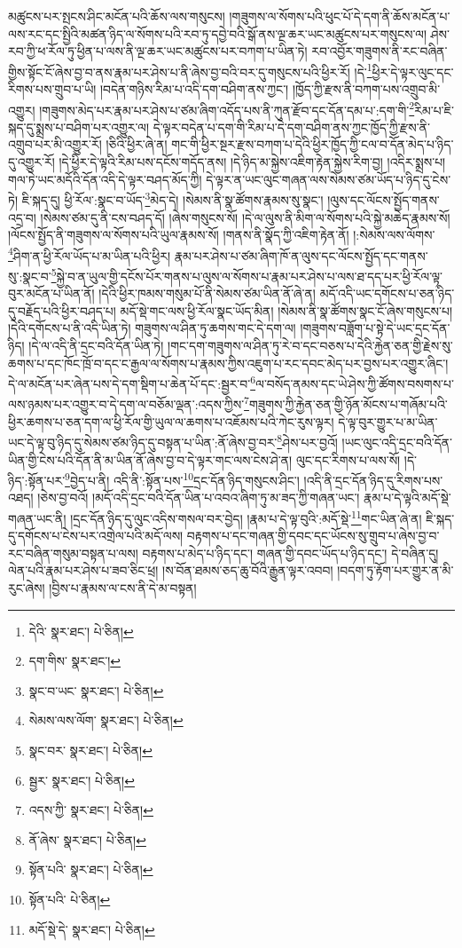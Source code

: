 མཚུངས་པར་སྤངས་ཤིང་མངོན་པའི་ཆོས་ལས་གསུངས། །གཟུགས་ལ་སོགས་པའི་ཕུང་པོ་དེ་དག་ནི་ཆོས་མངོན་པ་ལས་རང་དང་སྤྱིའི་མཚན་ཉིད་ལ་སོགས་པའི་རབ་ཏུ་དབྱེ་བའི་སྒོ་ནས་ལྔ་ཆར་ཡང་མཚུངས་པར་གསུངས་ལ། ཤེས་རབ་ཀྱི་ཕ་རོལ་ཏུ་ཕྱིན་པ་ལས་ནི་ལྔ་ཆར་ཡང་མཚུངས་པར་བཀག་པ་ཡིན་ཏེ། རབ་འབྱོར་གཟུགས་ནི་རང་བཞིན་གྱིས་སྟོང་ངོ་ཞེས་བྱ་བ་ནས་རྣམ་པར་ཤེས་པ་ནི་ཞེས་བྱ་བའི་བར་དུ་གསུངས་པའི་ཕྱིར་རོ། །དེ་\footnote{དེའི་  སྣར་ཐང་།  པེ་ཅིན། }ཕྱིར་དེ་ལྟར་ལུང་དང་རིགས་པས་གྲུབ་པ་ཡི། །བདེན་གཉིས་རིམ་པ་འདི་དག་བཤིག་ནས་ཀྱང་། །ཁྱོད་ཀྱི་རྫས་ནི་བཀག་པས་འགྲུབ་མི་འགྱུར། །གཟུགས་མེད་པར་རྣམ་པར་ཤེས་པ་ཙམ་ཞིག་འདོད་པས་ནི་ཀུན་རྫོབ་དང་དོན་དམ་པ་:དག་གི་\footnote{དག་གིས་  སྣར་ཐང་། }རིམ་པ་ཇི་སྐད་དུ་སྨྲས་པ་བཤིག་པར་འགྱུར་ལ། དེ་ལྟར་བདེན་པ་དག་གི་རིམ་པ་དེ་དག་བཤིག་ནས་ཀྱང་ཁྱོད་ཀྱི་རྫས་ནི་འགྲུབ་པར་མི་འགྱུར་རོ། །ཅིའི་ཕྱིར་ཞེ་ན། གང་གི་ཕྱིར་སྔར་རྫས་བཀག་པ་དེའི་ཕྱིར་ཁྱོད་ཀྱི་ངལ་བ་དོན་མེད་པ་ཉིད་དུ་འགྱུར་རོ། །དེ་ཕྱིར་དེ་ལྟའི་རིམ་པས་དངོས་གདོད་ནས། །དེ་ཉིད་མ་སྐྱེས་འཇིག་རྟེན་སྐྱེས་རིག་བྱ། །འདིར་སྨྲས་པ། གལ་ཏེ་ཡང་མདོའི་དོན་འདི་དེ་ལྟར་བཤད་མོད་ཀྱི། དེ་ལྟར་ན་ཡང་ལུང་གཞན་ལས་སེམས་ཙམ་ཡོད་པ་ཉིད་དུ་ངེས་ཏེ། ཇི་སྐད་དུ། ཕྱི་རོལ་:སྣང་བ་ཡོད་\footnote{སྣང་བ་ཡང་  སྣར་ཐང་།  པེ་ཅིན། }མེད་དེ། །སེམས་ནི་སྣ་ཚོགས་རྣམས་སུ་སྣང་། །ལུས་དང་ལོངས་སྤྱོད་གནས་འདྲ་བ། །སེམས་ཙམ་དུ་ནི་ངས་བཤད་དོ། །ཞེས་གསུངས་སོ། །དེ་ལ་ལུས་ནི་མིག་ལ་སོགས་པའི་སྐྱེ་མཆེད་རྣམས་སོ། །ལོངས་སྤྱོད་ནི་གཟུགས་ལ་སོགས་པའི་ཡུལ་རྣམས་སོ། །གནས་ནི་སྣོད་ཀྱི་འཇིག་རྟེན་ནོ། །:སེམས་ལས་ལོགས་\footnote{སེམས་ལས་ལོག་  སྣར་ཐང་།  པེ་ཅིན། }ཤིག་ན་ཕྱི་རོལ་ཡོད་པ་མ་ཡིན་པའི་ཕྱིར། རྣམ་པར་ཤེས་པ་ཙམ་ཞིག་ཁོ་ན་ལུས་དང་ལོངས་སྤྱོད་དང་གནས་སུ་:སྣང་བ་\footnote{སྣང་བར་  སྣར་ཐང་།  པེ་ཅིན། }སྐྱེ་བ་ན་ཡུལ་གྱི་དངོས་པོར་གནས་པ་ལུས་ལ་སོགས་པ་རྣམ་པར་ཤེས་པ་ལས་ཐ་དད་པར་ཕྱི་རོལ་ལྟ་བུར་མངོན་པ་ཡིན་ནོ། །དེའི་ཕྱིར་ཁམས་གསུམ་པོ་ནི་སེམས་ཙམ་ཡིན་ནོ་ཞེ་ན། མདོ་འདི་ཡང་དགོངས་པ་ཅན་ཉིད་དུ་བརྗོད་པའི་ཕྱིར་བཤད་པ། མདོ་སྡེ་གང་ལས་ཕྱི་རོལ་སྣང་ཡོད་མིན། །སེམས་ནི་སྣ་ཚོགས་སྣང་ངོ་ཞེས་གསུངས་པ། །དེའི་དགོངས་པ་ནི་འདི་ཡིན་ཏེ། གཟུགས་ལ་ཤིན་ཏུ་ཆགས་གང་དེ་དག་ལ། །གཟུགས་བཟློག་པ་སྟེ་དེ་ཡང་དྲང་དོན་ཉིད། །དེ་ལ་འདི་ནི་དྲང་བའི་དོན་ཡིན་ཏེ། །གང་དག་གཟུགས་ལ་ཤིན་ཏུ་རེ་བ་དང་བཅས་པ་དེའི་རྐྱེན་ཅན་གྱི་རྗེས་སུ་ཆགས་པ་དང་ཁོང་ཁྲོ་བ་དང་ང་རྒྱལ་ལ་སོགས་པ་རྣམས་ཀྱིས་འཇུག་པ་རང་དབང་མེད་པར་བྱས་པར་འགྱུར་ཞིང་། དེ་ལ་མངོན་པར་ཞེན་པས་དེ་དག་སྡིག་པ་ཆེན་པོ་དང་:སྦྱར་བ་\footnote{སྦྱར་  སྣར་ཐང་།  པེ་ཅིན། }ལ་བསོད་ནམས་དང་ཡེ་ཤེས་ཀྱི་ཚོགས་བསགས་པ་ལས་ཉམས་པར་འགྱུར་བ་དེ་དག་ལ་བཅོམ་ལྡན་:འདས་ཀྱིས་\footnote{འདས་ཀྱི་  སྣར་ཐང་།  པེ་ཅིན། }གཟུགས་ཀྱི་རྐྱེན་ཅན་གྱི་ཉོན་མོངས་པ་གཞོམ་པའི་ཕྱིར་ཆགས་པ་ཅན་དག་ལ་ཕྱི་རོལ་གྱི་ཡུལ་ལ་ཆགས་པ་འཇོམས་པའི་ཀེང་རུས་ལྟར། དེ་ལྟ་བུར་གྱུར་པ་མ་ཡིན་ཡང་དེ་ལྟ་བུ་ཉིད་དུ་སེམས་ཙམ་ཉིད་དུ་བསྟན་པ་ཡིན་:ནོ་ཞེས་བྱ་བར་\footnote{ནོ་ཞེས་  སྣར་ཐང་།  པེ་ཅིན། }ཤེས་པར་བྱའོ། །ཡང་ལུང་འདི་དྲང་བའི་དོན་ཡིན་གྱི་ངེས་པའི་དོན་ནི་མ་ཡིན་ནོ་ཞེས་བྱ་བ་དེ་ལྟར་གང་ལས་ངེས་ཤེ་ན། ལུང་དང་རིགས་པ་ལས་སོ། །དེ་ཉིད་:སྟོན་པར་\footnote{སྟོན་པའི་  སྣར་ཐང་།  པེ་ཅིན། }བྱེད་པ་ནི། འདི་ནི་:སྟོན་པས་\footnote{སྟོན་པའི་  པེ་ཅིན། }དྲང་དོན་ཉིད་གསུངས་ཤིང་། །འདི་ནི་དྲང་དོན་ཉིད་དུ་རིགས་པས་འཐད། །ཅེས་བྱ་བའོ། །མདོ་འདི་དྲང་བའི་དོན་ཡིན་པ་འབའ་ཞིག་ཏུ་མ་ཟད་ཀྱི་གཞན་ཡང་། རྣམ་པ་དེ་ལྟའི་མདོ་སྡེ་གཞན་ཡང་ནི། །དྲང་དོན་ཉིད་དུ་ལུང་འདིས་གསལ་བར་བྱེད། །རྣམ་པ་དེ་ལྟ་བུའི་:མདོ་སྡེ་\footnote{མདོ་སྡེ་དེ་  སྣར་ཐང་།  པེ་ཅིན། }གང་ཡིན་ཞེ་ན། ཇི་སྐད་དུ་དགོངས་པ་ངེས་པར་འགྲེལ་པའི་མདོ་ལས། བརྟགས་པ་དང་གཞན་གྱི་དབང་དང་ཡོངས་སུ་གྲུབ་པ་ཞེས་བྱ་བ་རང་བཞིན་གསུམ་བསྟན་པ་ལས། བརྟགས་པ་མེད་པ་ཉིད་དང་། གཞན་གྱི་དབང་ཡོད་པ་ཉིད་དང་། དེ་བཞིན་དུ། ལེན་པའི་རྣམ་པར་ཤེས་པ་ཟབ་ཅིང་ཕྲ། །ས་བོན་ཐམས་ཅད་ཆུ་བོའི་རྒྱུན་ལྟར་འབབ། །བདག་ཏུ་རྟོག་པར་གྱུར་ན་མི་རུང་ཞེས། །བྱིས་པ་རྣམས་ལ་ངས་ནི་དེ་མ་བསྟན། 
